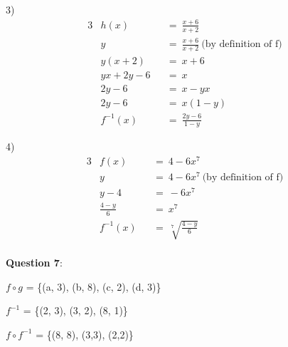 \documentclass{article} %
\newcommand{\question}[2][]{\begin{flushleft}
        \textbf{Question #1}: #2

\end{flushleft}}
\begin{document}
    3)
    \begin{alignat*}{3}
        & h(x)        &&=\ \frac{x+6}{x+2} \\
        & y           &&=\ \frac{x+6}{x+2} \ \text{(by definition of f)} \\
        & y(x + 2)    &&=\ x + 6 \\
        & yx + 2y - 6 &&=\ x \\
        & 2y - 6      &&=\ x - yx \\
        & 2y - 6      &&=\ x(1 - y) \\
        & f^{-1}(x)   &&=\ \frac{2y - 6}{1 - y}
    \end{alignat*}

    4)
    \begin{alignat*}{3}
        & f(x)            &&=\ 4 - 6x^7 \\
        & y               &&=\ 4 - 6x^7  \ \text{(by definition of f)}  \\
        & y - 4           &&=\ - 6x^7 \\
        & \frac{4 - y}{6} &&=\ x^7 \\
        & f^{-1}(x)       &&=\ \sqrt[7]{\frac{4 - y}{6}} \\
    \end{alignat*}

                                                                   

    \question[7]{}

    $f \circ g$ = \{(a, 3), (b, 8), (c, 2), (d, 3)\}
    
    $f^{-1}$ = \{(2, 3), (3, 2), (8, 1)\}

    $f \circ f^{-1}$ = \{(8, 8), (3,3), (2,2)\}

                                                                   
\end{document}
